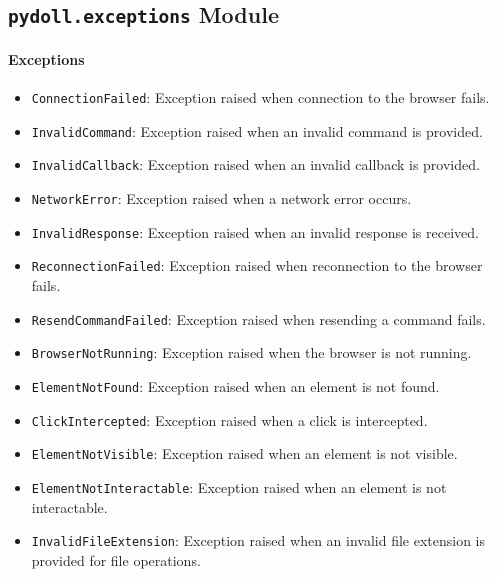 \documentclass{article}
\begin{document}
\hrulefill

\subsection*{\texttt{pydoll.exceptions} Module}

\paragraph{Exceptions}
\begin{itemize}
    \item \lstinline[style=pythonstyle]|ConnectionFailed|: Exception raised when connection to the browser fails.
    \item \lstinline[style=pythonstyle]|InvalidCommand|: Exception raised when an invalid command is provided.
    \item \lstinline[style=pythonstyle]|InvalidCallback|: Exception raised when an invalid callback is provided.
    \item \lstinline[style=pythonstyle]|NetworkError|: Exception raised when a network error occurs.
    \item \lstinline[style=pythonstyle]|InvalidResponse|: Exception raised when an invalid response is received.
    \item \lstinline[style=pythonstyle]|ReconnectionFailed|: Exception raised when reconnection to the browser fails.
    \item \lstinline[style=pythonstyle]|ResendCommandFailed|: Exception raised when resending a command fails.
    \item \lstinline[style=pythonstyle]|BrowserNotRunning|: Exception raised when the browser is not running.
    \item \lstinline[style=pythonstyle]|ElementNotFound|: Exception raised when an element is not found.
    \item \lstinline[style=pythonstyle]|ClickIntercepted|: Exception raised when a click is intercepted.
    \item \lstinline[style=pythonstyle]|ElementNotVisible|: Exception raised when an element is not visible.
    \item \lstinline[style=pythonstyle]|ElementNotInteractable|: Exception raised when an element is not interactable.
    \item \lstinline[style=pythonstyle]|InvalidFileExtension|: Exception raised when an invalid file extension is provided for file operations.
\end{itemize}
\end{document}
